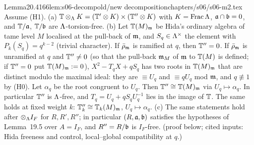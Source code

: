 \begin{quoted}{Lemma}{20.4}{166}{lem:s06-decomp}{old/new decomposition}{chapters/s06/s06-m2.tex}\label{rpt:lem:s06-decomp}
Assume (H1). (a) $\mathbb{T}\otimes_\Lambda K=(\mathbb{T}'\otimes K)\times(\mathbb{T}''\otimes K)$ with $K=\mathrm{Frac}\,\Lambda$, $\mathfrak{a}\cap\mathfrak{b}=0$, and
$\mathbb{T}/\mathfrak{a}$, $\mathbb{T}/\mathfrak{b}$ are $\Lambda$-torsion-free. (b) Let $\mathbb{T}(M)_{\mathfrak{m}}$ be Hida's ordinary algebra of tame level $M$ localised at the
pull-back of $\mathfrak{m}$, and $S_q\in\Lambda^\times$ the element with $P_k(S_q)=q^{k-2}$ (trivial character). If $\bar\rho_{\mathfrak{m}}$ is ramified at
$q$, then $\mathbb{T}''=0$. If $\bar\rho_{\mathfrak{m}}$ is unramified at $q$ and $\mathbb{T}''\ne0$ (so that the pull-back $\mathfrak{m}_M$ of $\mathfrak{m}$ to $\mathbb{T}(M)$ is defined; if $\mathbb{T}''=0$ put $\mathbb{T}(M)_{\mathfrak{m}}:=0$), $X^2-T_qX+qS_q$ has two roots in $\mathbb{T}(M)_{\mathfrak{m}}$ that are distinct modulo the maximal ideal: they are
$\equiv U_q$ and $\equiv qU_q$ mod $\mathfrak{m}$, and $q\not\equiv1$ by (H0). Let $\alpha_q$ be the root congruent to $U_q$. Then
$\mathbb{T}''\cong\mathbb{T}(M)_{\mathfrak{m}}$ via $U_q\mapsto\alpha_q$. In particular $\mathbb{T}''$ is $\Lambda$-free, and $T_q=U_q+qS_qU_q^{-1}$ lies in the image
of $\mathbb{T}$. The same holds at fixed weight $k$: $\mathbb{T}''_k\cong\mathbb{T}_k(M)_{\mathfrak{m}}$, $U_q\mapsto\alpha_q$.
 (c) The same statements
hold after $\otimes_\Lambda I_F$ for $R,R',R''$; in particular $(R,\mathfrak{a},\mathfrak{b})$ satisfies the hypotheses of Lemma~19.5 over
$A=I_F$, and $R''=R/\mathfrak{b}$ is $I_F$-free. \stpmc{} (proof below; cited inputs: Hida freeness and control, local--global
compatibility at $q$.)
\end{quoted}
